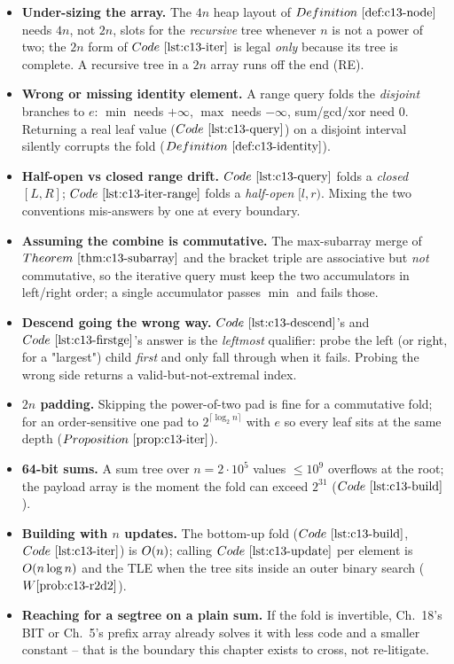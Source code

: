 \begin{itemize}[nosep, leftmargin=1.4em]
  \item \textbf{Under-sizing the array.} The \(4n\) heap layout of
        \(\defref{c13-node}\) needs \(4n\), not \(2n\), slots for the \emph{recursive}
        tree whenever \(n\) is not a power of two; the \(2n\) form of
        \(\coderef{c13-iter}\) is legal \emph{only} because its tree is complete.
        A recursive tree in a \(2n\) array runs off the end (RE).
  \item \textbf{Wrong or missing identity element.} A range query folds the
        \emph{disjoint} branches to \(e\): \(\min\) needs \(+\infty\), \(\max\) needs
        \(-\infty\), sum/gcd/xor need \(0\). Returning a real leaf value (\(\coderef{c13-query}\))
        on a disjoint interval silently corrupts the fold (\(\defref{c13-identity}\)).
  \item \textbf{Half-open vs closed range drift.} \(\coderef{c13-query}\) folds a
        \emph{closed} \([L,R]\); \(\coderef{c13-iter-range}\) folds a \emph{half-open}
        \([l,r)\). Mixing the two conventions mis-answers by one at every boundary.
  \item \textbf{Assuming the combine is commutative.} The max-subarray merge of
        \(\thmref{c13-subarray}\) and the bracket triple are associative but \emph{not}
        commutative, so the iterative query must keep the two accumulators in
        left/right order; a single accumulator passes \(\min\) and fails those.
  \item \textbf{Descend going the wrong way.} \(\coderef{c13-descend}\)'s and
        \(\coderef{c13-firstge}\)'s answer is the \emph{leftmost} qualifier: probe the
        left (or right, for a "largest") child \emph{first} and only fall through when
        it fails. Probing the wrong side returns a valid-but-not-extremal index.
  \item \textbf{\(2n\) padding.} Skipping the power-of-two pad is fine for a
        commutative fold; for an order-sensitive one pad to \(2^{\lceil\log_2 n\rceil}\)
        with \(e\) so every leaf sits at the same depth (\(\propref{c13-iter}\)).
  \item \textbf{64-bit sums.} A sum tree over \(n=2\cdot10^5\) values \(\le10^9\)
        overflows  at the root; the payload array is  the
        moment the fold can exceed \(2^{31}\) (\(\coderef{c13-build}\)).
  \item \textbf{Building with \(n\) updates.} The bottom-up fold
        (\(\coderef{c13-build}\), \(\coderef{c13-iter}\)) is \(O(n)\); calling
        \(\coderef{c13-update}\) per element is \(O(n\log n)\) and the TLE when the
        tree sits inside an outer binary search (\(\probref{c13-r2d2}\)).
  \item \textbf{Reaching for a segtree on a plain sum.} If the fold is invertible,
        Ch.~18's BIT or Ch.~5's prefix array already solves it with less code and a
        smaller constant -- that is the boundary this chapter exists to cross, not
        re-litigate.
\end{itemize}


